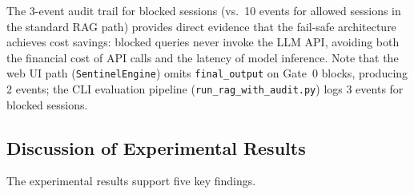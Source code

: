 \documentclass[journal]{IEEEtran}
\begin{document}
\begin{table}[!ht]
    \centering
    \caption{Audit Chain: Allowed vs.\ Blocked Session Comparison}
    \label{tab:audit_comparison}
\end{table}

The 3-event audit trail for blocked sessions (vs.\ 10 events for allowed sessions in the standard RAG path) provides direct evidence that the fail-safe architecture achieves cost savings: blocked queries never invoke the LLM API, avoiding both the financial cost of API calls and the latency of model inference. Note that the web UI path (\texttt{SentinelEngine}) omits \texttt{final\_output} on Gate~0 blocks, producing 2 events; the CLI evaluation pipeline (\texttt{run\_rag\_with\_audit.py}) logs 3 events for blocked sessions.

\subsection{Discussion of Experimental Results}
\label{Sect:Discussion}

The experimental results support five key findings.
\end{document}
